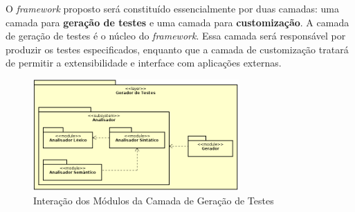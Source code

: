 \par
\indent O \textit{framework} proposto será constituído essencialmente por duas
camadas: uma camada para \textbf{geração de testes} e uma camada para
\textbf{customização}. A camada de geração de testes é o núcleo do \textit{framework}.
Essa camada será responsável por produzir os testes especificados, enquanto
que a camada de customização tratará de permitir a extensibilidade e interface
com aplicações externas.

   \begin{figure}[h]
    \centering
    \includegraphics[width=0.7\textwidth]{figuras/module-view-generator.png}
    \caption{Interação dos Módulos da Camada de Geração de Testes}
    \label{fig:entradasesaidas}
 \end{figure}

